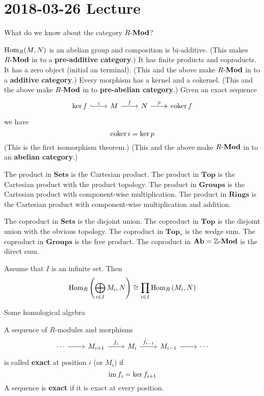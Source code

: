 \section{2018-03-26 Lecture}

\begin{rmk}
	What do we know about the category $R\mbox{-}\mathbf{Mod}$?
	\begin{itm}
		\io $\operatorname{Hom}_R(M,N)$ is an abelian group and composition is bi-additive. (This makes $R\mbox{-}\mathbf{Mod}$ in to a \textbf{pre-additive category}.)
		\io It has finite products and coproducts.
		\io It has a zero object (initial an terminal). (This and the above make $R\mbox{-}\mathbf{Mod}$ in to a \textbf{additive category}.)
		\io Every morphism has a kernel and a cokernel. (This and the above make $R\mbox{-}\mathbf{Mod}$ in to  \textbf{pre-abelian category}.)
		\io Given an exact sequence
		\[
		\begin{tikzcd}
			\ker f \ar[r, hookrightarrow, "i"] & M \ar[r, "f"] & N \ar[r, twoheadrightarrow, "p"] & \coker f
		\end{tikzcd}
		\]
		we have
		\[\operatorname{coker} i = \ker p\]
		(This is the first isomorphism theorem.)
		(This and the above make $R\mbox{-}\mathbf{Mod}$ in to an \textbf{abelian category}.)
	\end{itm}
\end{rmk}

\begin{exam}
	\leavevmode
	\begin{enum}
		\io The product in $\mathbf{Sets}$ is the Cartesian product.
		The product in $\mathbf{Top}$ is the Cartesian product with the product topology.
		The product in $\mathbf{Groups}$ is the Cartesian product with component-wise multiplication.
		The product in $\mathbf{Rings}$ is the Cartesian product with component-wise multiplication and addition.
		
		\io The coproduct in $\mathbf{Sets}$ is the disjoint union.
		The coproduct in $\mathbf{Top}$ is the disjoint union with the obvious topology.
		The coproduct in $\mathbf{Top_*}$ is the wedge sum.
		The coproduct in $\mathbf{Groups}$ is the free product.
		The coproduct in $\mathbf{Ab}=\mathbb{Z}\mbox{-}\mathbf{Mod}$ is the direct sum.
		
		\io Assume that $I$ is an infinite set.
		Then
		\[\operatorname{Hom}_R \left(\bigoplus_{i \in I} M_i, N\right) \cong \prod_{i \in I} \operatorname{Hom}_R \left(M_i, N\right)\]
	\end{enum}
\end{exam}

Some homological algebra

\begin{defn}[1.9]
	A sequence of $R$-modules and morphisms
	\[
	\begin{tikzcd}
		\cdots \ar[r] & M_{i+1} \ar[r, "f_i"] & M_i \ar[r, "f_{i-1}"] & M_{i-1} \ar[r] & \cdots
	\end{tikzcd}
	\]
	is called \textbf{exact} at position $i$ (or $M_i$) if
	\[\operatorname{im} f_i = \ker f_{i+1}\]
	A sequence is \textbf{exact} if it is exact at every position.
\end{defn}

